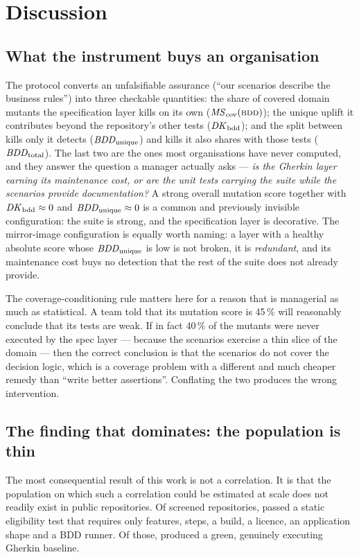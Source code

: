 \section{Discussion}
\label{sec:discussion}

\subsection{What the instrument buys an organisation}

The protocol converts an unfalsifiable assurance (``our scenarios describe the business rules'') into
three checkable quantities: the share of covered domain mutants the specification layer kills on its
own ($\mathit{MS}_{\mathrm{cov}}(\textsc{bdd})$); the unique uplift it contributes beyond the repository's other tests ($\mathit{DK}_{\mathrm{bdd}}$);
and the split between kills only it detects ($\mathit{BDD}_{\mathrm{unique}}$) and kills it also shares with those
tests ($\mathit{BDD}_{\mathrm{total}}$). The last two are the ones most organisations have never computed, and they
answer the question a manager actually asks --- \emph{is the Gherkin layer earning its maintenance
cost, or are the unit tests carrying the suite while the scenarios provide documentation?} A strong
overall mutation score together with $\mathit{DK}_{\mathrm{bdd}} \approx 0$ and $\mathit{BDD}_{\mathrm{unique}} \approx 0$ is a common and
previously invisible configuration: the suite is strong, and the specification layer is decorative.
The mirror-image configuration is equally worth naming: a layer with a healthy absolute score whose
$\mathit{BDD}_{\mathrm{unique}}$ is low is not broken, it is \emph{redundant}, and its maintenance cost buys no
detection that the rest of the suite does not already provide.

The coverage-conditioning rule matters here for a reason that is managerial as much as statistical. A
team told that its mutation score is 45\,\% will reasonably conclude that its tests are weak. If in
fact 40\,\% of the mutants were never executed by the spec layer --- because the scenarios exercise a
thin slice of the domain --- then the correct conclusion is that the scenarios do not cover the
decision logic, which is a coverage problem with a different and much cheaper remedy than
``write better assertions''. Conflating the two produces the wrong intervention.

\subsection{The finding that dominates: the population is thin}

The most consequential result of this work is not a correlation. It is that the population on which
such a correlation could be estimated at scale does not readily exist in public repositories. Of
\Nscreened{} screened repositories, \Neligible{} passed a static eligibility test that requires only
features, steps, a build, a licence, an application shape and a BDD runner. Of those, \Ngreen{}
produced a green, genuinely executing Gherkin baseline.

